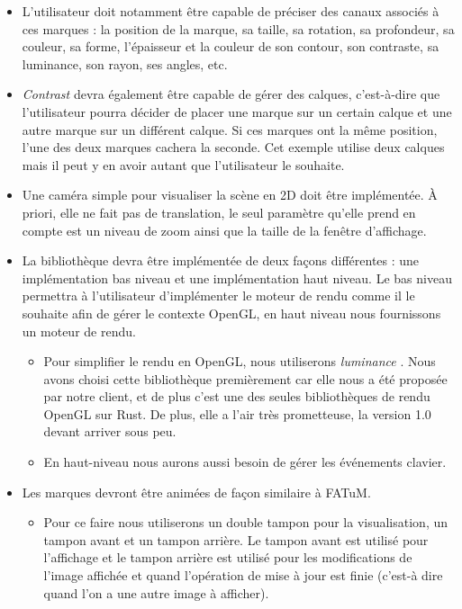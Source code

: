 \documentclass[12pt]{article}
\begin{document}
\begin{itemize}
\item L'utilisateur doit notamment être capable de préciser des \gls{canaux} associés à
ces marques : la position de la marque, sa taille, sa rotation, sa profondeur, sa couleur, sa forme,
l'épaisseur et la couleur de son contour, son contraste, sa luminance, son rayon, ses angles, etc.
\item \textit{Contrast} devra également être capable de gérer des calques, c'est-à-dire que l'utilisateur pourra
décider de placer une marque sur un certain calque et une autre marque sur un différent calque. Si ces
marques ont la même position, l'une des deux marques cachera la seconde. Cet exemple utilise deux calques
mais il peut y en avoir autant que l'utilisateur le souhaite.
\item Une caméra simple pour visualiser la scène en 2D doit être implémentée. À priori, elle ne fait pas
de translation, le seul paramètre qu'elle prend en compte est un niveau de zoom ainsi que la taille
de la fenêtre d'affichage.
\item La bibliothèque devra être implémentée de deux façons différentes : une implémentation bas niveau et une implémentation haut niveau.
		Le bas niveau permettra à l'utilisateur d'implémenter le moteur de rendu comme il le souhaite afin de gérer le contexte OpenGL, en haut niveau 
nous fournissons un moteur de rendu.
		\begin{itemize}
			\item Pour simplifier le rendu en OpenGL, nous utiliserons \textit{luminance} \cite{luminance}. Nous avons choisi cette bibliothèque
			premièrement car elle nous a été proposée par notre client, et de plus c'est une des seules bibliothèques de rendu OpenGL sur Rust. De 
plus, elle a l'air très prometteuse, la version 1.0 devant arriver sous peu.
			\item En haut-niveau nous aurons aussi besoin de gérer les événements clavier.
		\end{itemize}
\item Les marques devront être animées de façon similaire à FATuM.
	\begin{itemize}
	\item Pour ce faire nous utiliserons un double tampon pour la visualisation, un tampon avant et un tampon arrière.
	Le tampon avant est utilisé pour l'affichage et le tampon arrière est utilisé pour les modifications de l'image affichée et quand l'opération de 
mise à jour est finie (c'est-à dire quand l'on a une autre image à afficher).

\end{itemize}
\end{itemize}
\end{document}
